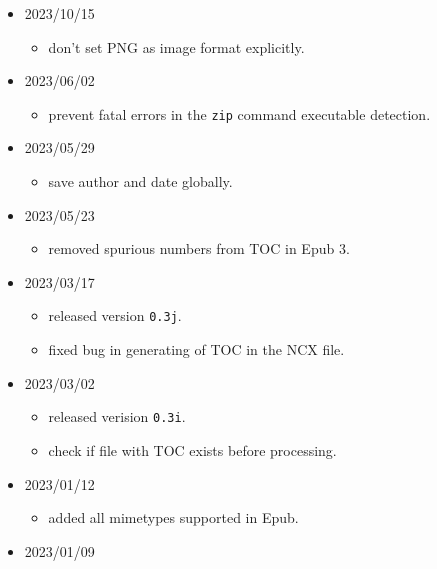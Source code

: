 \begin{itemize}
  \begin{itemize}
  \tightlist
  \item
    added the \texttt{-\/-build-dir} command line option.
  \end{itemize}
\item
  2023/10/15

  \begin{itemize}
  \tightlist
  \item
    don't set PNG as image format explicitly.
  \end{itemize}
\item
  2023/06/02

  \begin{itemize}
  \tightlist
  \item
    prevent fatal errors in the \texttt{zip} command executable
    detection.
  \end{itemize}
\item
  2023/05/29

  \begin{itemize}
  \tightlist
  \item
    save author and date globally.
  \end{itemize}
\item
  2023/05/23

  \begin{itemize}
  \tightlist
  \item
    removed spurious numbers from TOC in Epub 3.
  \end{itemize}
\item
  2023/03/17

  \begin{itemize}
  \tightlist
  \item
    released version \texttt{0.3j}.
  \item
    fixed bug in generating of TOC in the NCX file.
  \end{itemize}
\item
  2023/03/02

  \begin{itemize}
  \tightlist
  \item
    released verision \texttt{0.3i}.
  \item
    check if file with TOC exists before processing.
  \end{itemize}
\item
  2023/01/12

  \begin{itemize}
  \tightlist
  \item
    added all mimetypes supported in Epub.
  \end{itemize}
\item
  2023/01/09


\end{itemize}
